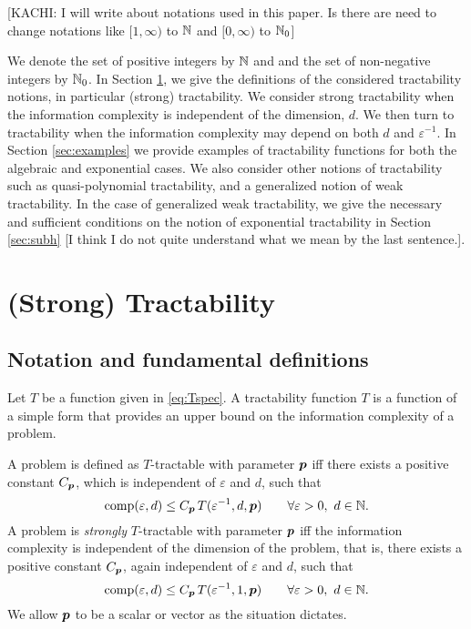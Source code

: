 \documentclass[sort&compress]{elsarticle}
\newcommand{\peter}[1]{\begingroup\color{violet}#1\endgroup}
\newcommand{\kachi}[1]{\begingroup\color{ForestGreen}#1\endgroup}
\begin{document}
\kachi{[KACHI: I will write about notations used in this paper. Is there are need to change notations like $[1,\infty)$ to $\mathbb{N}$ and $[0,\infty)$ to $\mathbb{N}_0$]}

We denote the set of positive integers by $\mathbb{N}$ and and the set of non-negative integers by $\mathbb{N}_0$.
In Section \ref{sec:spt}, we give the definitions of the considered tractability notions, in particular (strong) tractability. We consider strong tractability when the information complexity is independent of the dimension, $d$. We then turn to tractability  when the information complexity may depend on both $d$ and $\varepsilon^{-1}$. In Section \ref{sec:examples} we provide examples of tractability functions for both the algebraic and exponential cases. We also consider other notions of tractability such as quasi-polynomial tractability, and a generalized notion of weak tractability. In the case of generalized weak tractability, we give the necessary and sufficient conditions on the notion of exponential tractability in Section \ref{sec:subh} \peter{[I think I do not quite understand what we mean by the last sentence.]}.

\section{(Strong) Tractability}\label{sec:spt}

\subsection{Notation and fundamental definitions} \label{sec:not}
Let $T$ be a function given in \eqref{eq:Tspec}.
A tractability function $T$ is a function of a simple form that provides an upper bound on the information complexity of a problem.


\begin{definition}
    A problem is defined as $T$-tractable with parameter $\boldsymbol{p}$ iff there exists a positive constant $C_{\boldsymbol{p}}$, which is independent of $\varepsilon$ and $d$, such that
\begin{equation} \label{eq:tract_def}
	\operatorname{comp}(\varepsilon,d) \le C_{\boldsymbol{p}}\, T(\varepsilon^{-1},d,\boldsymbol{p}) \qquad \forall \varepsilon >0, \ d \in \mathbb{N}.
\end{equation}
A problem is \emph{strongly}
$T$-tractable with parameter $\boldsymbol{p}$ iff the information complexity is independent of the dimension of the problem, that is, there exists a positive constant $C_{\boldsymbol{p}}$, again independent of $\varepsilon$ and $d$, such that
\begin{equation} \label{eq:strong_tract_def}
	\operatorname{comp}(\varepsilon,d) \le C_{\boldsymbol{p}}\, T(\varepsilon^{-1},1,\boldsymbol{p}) \qquad \forall \varepsilon >0 , \ d \in \mathbb{N}.
\end{equation}
We allow $\boldsymbol{p}$ to be a scalar or vector as the situation dictates.
\end{definition}
\end{document}
